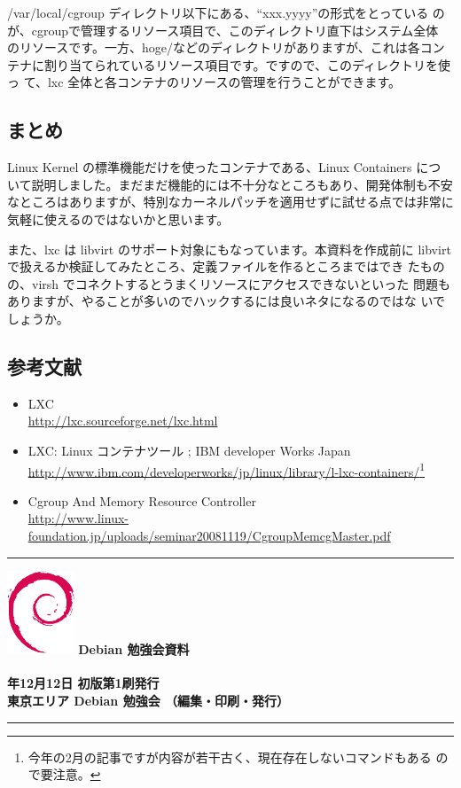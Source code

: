 \documentclass[mingoth,a4paper]{jsarticle}
\newcommand{\debmtgyear}{2009}
\newcommand{\debmtgmonth}{12}
\newcommand{\debmtgdate}{12}
\begin{document}
/var/local/cgroup ディレクトリ以下にある、``xxx.yyyy''の形式をとっている
のが、cgroupで管理するリソース項目で、このディレクトリ直下はシステム全体
のリソースです。一方、hoge/などのディレクトリがありますが、これは各コン
テナに割り当てられているリソース項目です。ですので、このディレクトリを使っ
て、lxc 全体と各コンテナのリソースの管理を行うことができます。

\subsection{まとめ}

Linux Kernel の標準機能だけを使ったコンテナである、Linux Containers につ
いて説明しました。まだまだ機能的には不十分なところもあり、開発体制も不安
なところはありますが、特別なカーネルパッチを適用せずに試せる点では非常に
気軽に使えるのではないかと思います。

また、lxc は libvirt のサポート対象にもなっています。本資料を作成前に
libvirt で扱えるか検証してみたところ、定義ファイルを作るところまではでき
たものの、virsh でコネクトするとうまくリソースにアクセスできないといった
問題もありますが、やることが多いのでハックするには良いネタになるのではな
いでしょうか。

\subsection{参考文献}

\begin{itemize}
\item LXC\\
      \url{http://lxc.sourceforge.net/lxc.html}

\item LXC: Linux コンテナツール ; IBM developer Works Japan\\
      \url{http://www.ibm.com/developerworks/jp/linux/library/l-lxc-containers/}\footnote{
      今年の2月の記事ですが内容が若干古く、現在存在しないコマンドもある
      ので要注意。}
\item Cgroup And Memory Resource Controller\\
      \url{http://www.linux-foundation.jp/uploads/seminar20081119/CgroupMemcgMaster.pdf}
\end{itemize}



\vspace*{15cm}
\hrule
\vspace{2mm}
\includegraphics[width=2cm]{image200502/openlogo-nd.eps}
\noindent \Large \bf Debian 勉強会資料\\ \\
\noindent \normalfont \debmtgyear{}年\debmtgmonth{}月\debmtgdate{}日 \hspace{5mm}  初版第1刷発行\\
\noindent \normalfont 東京エリア Debian 勉強会 （編集・印刷・発行）\\
\hrule
\end{document}
